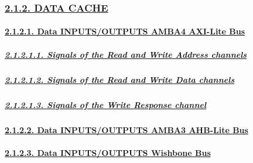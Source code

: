 \documentclass[
]{article}
\begin{document}
\hypertarget{data-cache}{%
\subsubsection{\texorpdfstring{\protect\hyperlink{data-cache-1}{2.1.2.
DATA CACHE}}{2.1.2. DATA CACHE}}\label{data-cache}}

\hypertarget{data-inputsoutputs-amba4-axi-lite-bus}{%
\paragraph{\texorpdfstring{\protect\hyperlink{data-inputsoutputs-amba4-axi-lite-bus-1}{2.1.2.1.
Data INPUTS/OUTPUTS AMBA4 AXI-Lite
Bus}}{2.1.2.1. Data INPUTS/OUTPUTS AMBA4 AXI-Lite Bus}}\label{data-inputsoutputs-amba4-axi-lite-bus}}

\hypertarget{signals-of-the-read-and-write-address-channels-1}{%
\subparagraph{\texorpdfstring{\protect\hyperlink{signals-of-the-read-and-write-address-channels-3}{2.1.2.1.1.
Signals of the Read and Write Address
channels}}{2.1.2.1.1. Signals of the Read and Write Address channels}}\label{signals-of-the-read-and-write-address-channels-1}}

\hypertarget{signals-of-the-read-and-write-data-channels-1}{%
\subparagraph{\texorpdfstring{\protect\hyperlink{signals-of-the-read-and-write-data-channels-3}{2.1.2.1.2.
Signals of the Read and Write Data
channels}}{2.1.2.1.2. Signals of the Read and Write Data channels}}\label{signals-of-the-read-and-write-data-channels-1}}

\hypertarget{signals-of-the-write-response-channel-1}{%
\subparagraph{\texorpdfstring{\protect\hyperlink{signals-of-the-write-response-channel-3}{2.1.2.1.3.
Signals of the Write Response
channel}}{2.1.2.1.3. Signals of the Write Response channel}}\label{signals-of-the-write-response-channel-1}}

\hypertarget{data-inputsoutputs-amba3-ahb-lite-bus}{%
\paragraph{\texorpdfstring{\protect\hyperlink{data-inputsoutputs-amba3-ahb-lite-bus-1}{2.1.2.2.
Data INPUTS/OUTPUTS AMBA3 AHB-Lite
Bus}}{2.1.2.2. Data INPUTS/OUTPUTS AMBA3 AHB-Lite Bus}}\label{data-inputsoutputs-amba3-ahb-lite-bus}}

\hypertarget{data-inputsoutputs-wishbone-bus}{%
\paragraph{\texorpdfstring{\protect\hyperlink{data-inputsoutputs-wishbone-bus-1}{2.1.2.3.
Data INPUTS/OUTPUTS Wishbone
Bus}}{2.1.2.3. Data INPUTS/OUTPUTS Wishbone Bus}}\label{data-inputsoutputs-wishbone-bus}}
\end{document}
